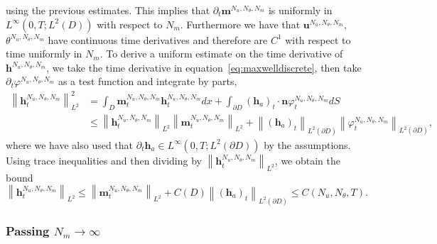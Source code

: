\documentclass[10pt,letterpaper,twoside]{amsart}
\theoremstyle{definition}{\newtheorem{definition}[lemma]{Definition}}
\theoremstyle{note}{\newtheorem{claim}{Claim}[section]
\newtheorem*{claim*}{Claim}}
\numberwithin{equation}{section}
\newcommand{\dom}{D}
\newcommand{\norm}[1]{\left\| #1 \right\|}
\newcommand{\bma}{\mathbf{m}^{N_u,N_\theta,N_m}}
\newcommand{\bha}{\mathbf{h}^{N_u,N_\theta,N_m}}
\newcommand{\bua}{\mathbf{u}^{N_u,N_\theta,N_m}}
\newcommand{\tha}{\theta^{N_u,N_\theta,N_m}}
\newcommand{\pha}{\varphi^{N_u,N_\theta,N_m}}
\newcommand{\bh}{\mathbf{h}}
\begin{document}
using the previous estimates. This implies that $\partial_t\bma$ is uniformly in $L^\infty(0,T;L^2(\dom))$ with respect to $N_m$. Furthermore we have that $\bua$, $\tha$ have continuous time derivatives and therefore are $C^1$ with respect to time uniformly in $N_m$. 
To derive a uniform estimate on the time derivative of $\bha$, we take the time derivative in equation~\eqref{eq:maxwelldiscrete}, then take $\partial_t \pha$ as a test function and integrate by parts,
\begin{align*}
	\norm{\bha_t}_{L^2}^2 & = \int_{\dom}\bma_t \bha_t dx + \int_{\partial\dom} (\bh_a)_t\cdot\mathbf{n} \pha_t dS\\
	&\leq \norm{\bha_t}_{L^2}\norm{\bma_t}_{L^2} + \norm{(\bh_a)_t}_{L^2(\partial\dom)}\norm{\pha_t}_{L^2(\partial\dom)},
\end{align*}
where we have also used that $\partial_t \bh_a\in L^\infty(0,T;L^2(\partial\dom))$ by the assumptions.
Using trace inequalities and then dividing by $\norm{\bha_t}_{L^2}$, we obtain the bound
\begin{equation*}
	\norm{\bha_t}_{L^2} \leq \norm{\bma_t}_{L^2} +C(\dom) \norm{(\bh_a)_t}_{L^2(\partial\dom)}\leq C(N_u , N_\theta,T).
\end{equation*}
\subsubsection{Passing $N_m \to \infty$}
\label{sec:Nm-limit}
\end{document}
